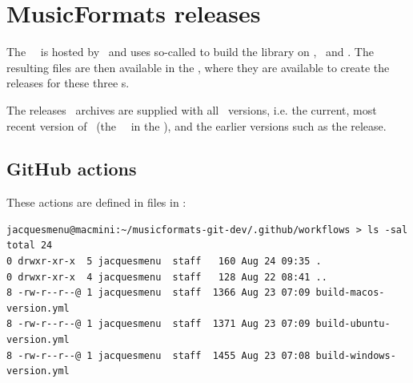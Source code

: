 
\chapter{MusicFormats releases}\label{MusicFormats releases}

%
%  
%  
%  
%    
%    
%    
%
%
%
%


The \mf\ \repo\ is hosted by \github\ and uses so-called  to build the library on \MacOS, \Ubuntu\ and \Windows. The resulting files are then available in the \repo, where they are available to create the releases for these three \OS s.

The releases \zip\ archives are supplied with all \mf\ versions, i.e. the current, most recent version of \mf\ (the \ \masterBranch\ in the \repo), and the earlier versions such as the  release.


\section{GitHub actions}

These actions are defined in  files in :
\begin{lstlisting}[language=Terminal]
jacquesmenu@macmini:~/musicformats-git-dev/.github/workflows > ls -sal
total 24
0 drwxr-xr-x  5 jacquesmenu  staff   160 Aug 24 09:35 .
0 drwxr-xr-x  4 jacquesmenu  staff   128 Aug 22 08:41 ..
8 -rw-r--r--@ 1 jacquesmenu  staff  1366 Aug 23 07:09 build-macos-version.yml
8 -rw-r--r--@ 1 jacquesmenu  staff  1371 Aug 23 07:09 build-ubuntu-version.yml
8 -rw-r--r--@ 1 jacquesmenu  staff  1455 Aug 23 07:08 build-windows-version.yml
\end{lstlisting}

